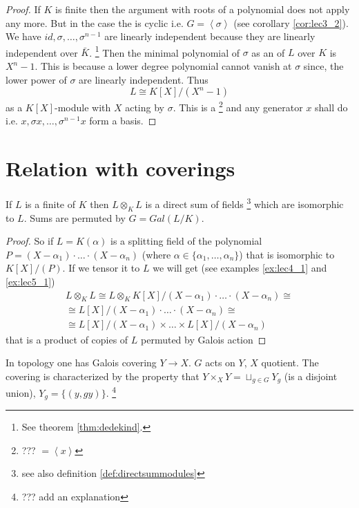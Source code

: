 \begin{theorem}
\begin{proof}
    If $K$ is finite then the argument with roots of a polynomial does
    not apply any more. But in the case the  is
    cyclic i.e. $G = \left<\sigma\right>$ (see corollary
    \ref{cor:lec3_2}). 
    We have $id, \sigma, \dots,
    \sigma^{n-1}$ are linearly independent because they are linearly
    independent  over
    $\bar{K}$.
    \footnote{
      See theorem \ref{thm:dedekind}.
    }
    Then the minimal polynomial of $\sigma$ as an
     of $L$ over $K$ is $X^n - 1$.
    This is because a lower degree polynomial cannot vanish at
    $\sigma$
    since, the lower power of $\sigma$ are linearly independent.  
    Thus
    \[
    L \cong K\left[X\right]/\left(X^n - 1\right)
    \]
    as a $K\left[X\right]$-module with $X$ acting by $\sigma$. This is
    a 
    \footnote{
      ??? $ = \left<x\right>$
    }
    and any generator $x$ shall do i.e. $x, \sigma x, \dots,
    \sigma^{n-1} x$ form a basis.
  \end{proof}
\end{theorem}

\section{Relation with coverings}

\begin{remark}
  If $L$ is a finite  of $K$ then
  $ L \otimes_K L$ is a direct sum of fields
  \footnote{
    see also definition \ref{def:directsummodules}
  }
  which are
  isomorphic to $L$. Sums are permuted by $G = Gal\left(L/K\right)$.
  \begin{proof}
  So if $L = K\left(\alpha\right)$ is a splitting field of the
  polynomial $P = \left(X - \alpha_1\right) \cdot \dots \cdot \left(X
  - \alpha_n\right)$ (where $\alpha \in \{\alpha_1, \dots,
  \alpha_n\}$) that is isomorphic to $K\left[X\right]/(P)$. If 
  we tensor it to $L$ we will get (see examples \ref{ex:lec4_1} and
  \ref{ex:lec5_1}) 
  \begin{eqnarray}
    L \otimes_K L \cong
    L \otimes_K K\left[X\right]/\left(X - \alpha_1\right) \cdot \dots \cdot \left(X
    - \alpha_n\right) \cong
    \nonumber \\
    \cong
  L\left[X\right]/\left(X - \alpha_1\right) \cdot \dots \cdot \left(X
  - \alpha_n\right) \cong
  \nonumber \\
  \cong
  L\left[X\right]/\left(X - \alpha_1\right) \times
  \dots \times
  L\left[X\right]/\left(X - \alpha_n\right)
  \nonumber
  \end{eqnarray}
  that is a product of copies of $L$ permuted by Galois action
  \end{proof}
  \label{rem:lec8_1}
\end{remark}

In topology one has Galois covering $Y \to X$. $G$ acts on $Y$, $X$
quotient. The covering is characterized by the property that $Y
\times_X Y = \sqcup_{g \in G} Y_g$ (is a disjoint union), $Y_g =
\{\left(y, gy\right)\}$. 
\footnote{
  ??? add an explanation
}
